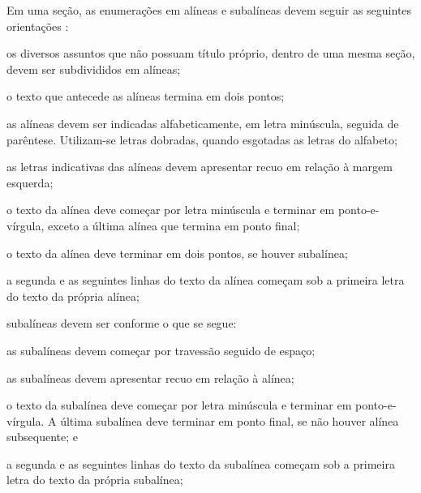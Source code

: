 Em uma seção, as enumerações em alíneas e subalíneas devem seguir as seguintes orientações \cite[seção 4.2]{NBR6024:2012}:

\begin{alineas}

  \item os diversos assuntos que não possuam título próprio, dentro de uma mesma
  seção, devem ser subdivididos em alíneas; 
  
  \item o texto que antecede as alíneas termina em dois pontos;
  \item as alíneas devem ser indicadas alfabeticamente, em letra minúscula,
  seguida de parêntese. Utilizam-se letras dobradas, quando esgotadas as
  letras do alfabeto;

  \item as letras indicativas das alíneas devem apresentar recuo em relação à
  margem esquerda;

  \item o texto da alínea deve começar por letra minúscula e terminar em
  ponto-e-vírgula, exceto a última alínea que termina em ponto final;

  \item o texto da alínea deve terminar em dois pontos, se houver subalínea;

  \item a segunda e as seguintes linhas do texto da alínea começam sob a
  primeira letra do texto da própria alínea;
  
  \item subalíneas \cite[seção 4.3]{NBR6024:2012} devem ser conforme o que se segue:

  \begin{alineas}
     \item as subalíneas devem começar por travessão seguido de espaço;

     \item as subalíneas devem apresentar recuo em relação à alínea;

     \item o texto da subalínea deve começar por letra minúscula e terminar em
     ponto-e-vírgula. A última subalínea deve terminar em ponto final, se não
     houver alínea subsequente; e

     \item a segunda e as seguintes linhas do texto da subalínea começam sob a
     primeira letra do texto da própria subalínea;
  \end{alineas}
  

\end{alineas}
